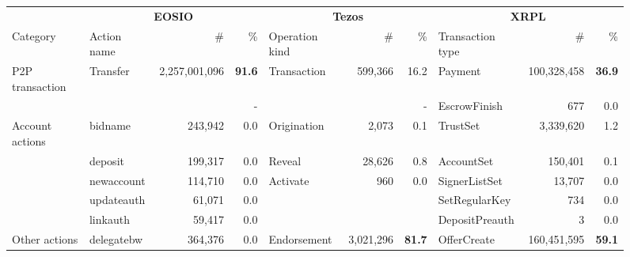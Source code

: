 \begin{figure*}[tbp]
  \centering
    \setlength{\tabcolsep}{2.2pt}
    \footnotesize
    \begin{tabular}{@{}lp{0.7in}rrp{1.2in}rrp{0.9in}rr@{}}
    \toprule
      & \multicolumn{3}{c}{\textbf{EOSIO}} & \multicolumn{3}{c}{\textbf{Tezos}} & \multicolumn{3}{c}{\textbf{ XRPL }} \\
    Category & Action name & \# & \% & Operation kind & \# & \% & Transaction type &  \#  & \% \\
    \cmidrule(r){1-1} \cmidrule(rl){2-4} \cmidrule(rl){5-7} \cmidrule(l){8-10}
    P2P transaction & Transfer &                       2,257,001,096  & \textbf{             91.6} & Transaction &                     599,366  &              16.2  & Payment &                    100,328,458  & \textbf{             36.9} \\
      &   &   &                   -    &   &   &                   -    & EscrowFinish &                                    677  &                 0.0  \\
    \cmidrule(r){1-1} \cmidrule(rl){2-4} \cmidrule(rl){5-7} \cmidrule(l){8-10}
    Account actions & bidname &                                  243,942  &                 0.0  & Origination &                         2,073  &                 0.1  & TrustSet &                         3,339,620  &                 1.2  \\
      & deposit &                                  199,317  &                 0.0  & Reveal &                       28,626  &                 0.8  & AccountSet &                            150,401  &                 0.1  \\
      & newaccount &                                  114,710  &                 0.0  & Activate &                             960  &                 0.0  & SignerListSet &                              13,707  &                 0.0  \\
      & updateauth &                                    61,071  &                 0.0  &   &   &   & SetRegularKey &                                    734  &                 0.0  \\
      & linkauth &                                    59,417  &                 0.0  &   &   &   & DepositPreauth &                                         3  &                 0.0  \\
    \cmidrule(r){1-1} \cmidrule(rl){2-4} \cmidrule(rl){5-7} \cmidrule(l){8-10}
    Other actions & delegatebw &                                  364,376  &                 0.0  & Endorsement &                 3,021,296  & \textbf{             81.7} & OfferCreate &                    160,451,595  & \textbf{             59.1} \\

\end{tabular}
\end{figure*}

